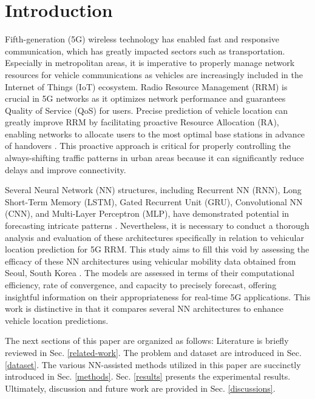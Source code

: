 \documentclass[conference]{IEEEtran}
\begin{document}
\section{Introduction} \label{introduction}
Fifth-generation (5G) wireless technology has enabled fast and responsive communication, which has greatly impacted sectors such as transportation. Especially in metropolitan areas, it is imperative to properly manage network resources for vehicle communications as vehicles are increasingly included in the Internet of Things (IoT) ecosystem. Radio Resource Management (RRM) is crucial in 5G networks as it optimizes network performance and guarantees Quality of Service (QoS) for users. Precise prediction of vehicle location can greatly improve RRM by facilitating proactive Resource Allocation (RA), enabling networks to allocate users to the most optimal base stations in advance of handovers \cite{7931566}. This proactive approach is critical for properly controlling the always-shifting traffic patterns in urban areas because it can significantly reduce delays and improve connectivity.

Several Neural Network (NN) structures, including Recurrent NN (RNN), Long Short-Term Memory (LSTM), Gated Recurrent Unit (GRU), Convolutional NN (CNN), and Multi-Layer Perceptron (MLP), have demonstrated potential in forecasting intricate patterns \cite{6795963,9204396}. Nevertheless, it is necessary to conduct a thorough analysis and evaluation of these architectures specifically in relation to vehicular location prediction for 5G RRM. This study aims to fill this void by assessing the efficacy of these NN architectures using vehicular mobility data obtained from Seoul, South Korea \cite{dataset20kumbhar}. The models are assessed in terms of their computational efficiency, rate of convergence, and capacity to precisely forecast, offering insightful information on their appropriateness for real-time 5G applications. This work is distinctive in that it compares several NN architectures to enhance vehicle location predictions.

The next sections of this paper are organized as follows: Literature is briefly reviewed in Sec. \ref{related-work}. The problem and dataset are introduced in Sec. \ref{dataset}. The various NN-assisted methods utilized in this paper are succinctly introduced in Sec. \ref{methods}. Sec. \ref{results} presents the experimental results. Ultimately, discussion and future work are provided in Sec. \ref{discussions}.
\end{document}
